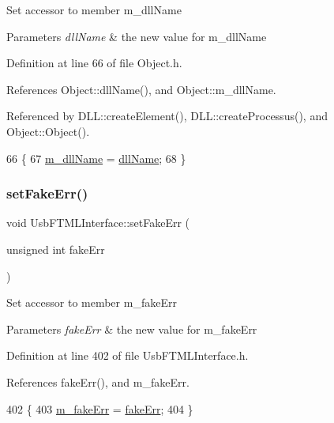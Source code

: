 Set accessor to member m\+\_\+dll\+Name 
\begin{DoxyParams}{Parameters}
{\em dll\+Name} & the new value for m\+\_\+dll\+Name \\
\hline
\end{DoxyParams}


Definition at line 66 of file Object.\+h.



References Object\+::dll\+Name(), and Object\+::m\+\_\+dll\+Name.



Referenced by D\+L\+L\+::create\+Element(), D\+L\+L\+::create\+Processus(), and Object\+::\+Object().


\begin{DoxyCode}
66                                       \{
67     \hyperlink{classObject_a01afbeacebb8db6831559972ec362eb3}{m\_dllName} = \hyperlink{classObject_a2e3947f2870094c332d7454117f3ec63}{dllName};
68   \}
\end{DoxyCode}
\mbox{\label{classUsbFTMLInterface_a01a8080338c5de181ad70b7506c97bc4}} 
\subsubsection{\texorpdfstring{set\+Fake\+Err()}{setFakeErr()}}
{\footnotesize\ttfamily void Usb\+F\+T\+M\+L\+Interface\+::set\+Fake\+Err (\begin{DoxyParamCaption}\item[{unsigned int}]{fake\+Err }\end{DoxyParamCaption})\hspace{0.3cm}{\ttfamily [inline]}}

Set accessor to member m\+\_\+fake\+Err 
\begin{DoxyParams}{Parameters}
{\em fake\+Err} & the new value for m\+\_\+fake\+Err \\
\hline
\end{DoxyParams}


Definition at line 402 of file Usb\+F\+T\+M\+L\+Interface.\+h.



References fake\+Err(), and m\+\_\+fake\+Err.


\begin{DoxyCode}
402                                          \{
403     \hyperlink{classUsbFTMLInterface_a35c84586c9aae7555b56481d636338e8}{m\_fakeErr} = \hyperlink{classUsbFTMLInterface_a0379dd75800521cea37580d68205f620}{fakeErr};
404   \}
\end{DoxyCode}
\mbox{\label{classObject_a398fe08cba594a0ce6891d59fe4f159f}} 
